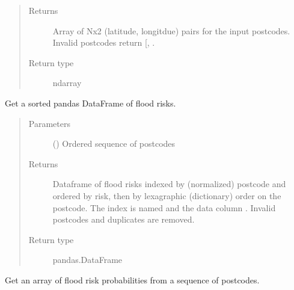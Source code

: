 \documentclass[letterpaper,10pt,english]{sphinxmanual}
\begin{document}
\begin{fulllineitems}
\begin{fulllineitems}
\begin{quote}
\begin{description}
\item[{Returns}] \leavevmode
Array of Nx2 (latitude, longitdue) pairs for the input postcodes.
Invalid postcodes return {[}, \sphinxtitleref{numpy.nan}{]}.

\item[{Return type}] \leavevmode
ndarray

\end{description}\end{quote}

\end{fulllineitems}


\begin{fulllineitems}
\label{\detokenize{index:flood_tool.Tool.get_sorted_annual_flood_risk}}
Get a sorted pandas DataFrame of flood risks.
\begin{quote}\begin{description}
\item[{Parameters}] \leavevmode
{} () \textendash{} Ordered sequence of postcodes

\item[{Returns}] \leavevmode
Dataframe of flood risks indexed by (normalized) postcode and ordered by risk,
then by lexagraphic (dictionary) order on the postcode. The index is named
 and the data column .
Invalid postcodes and duplicates are removed.

\item[{Return type}] \leavevmode
pandas.DataFrame

\end{description}\end{quote}

\end{fulllineitems}


\begin{fulllineitems}
\label{\detokenize{index:flood_tool.Tool.get_sorted_flood_probability}}
Get an array of flood risk probabilities from a sequence of postcodes.


\end{fulllineitems}
\end{fulllineitems}
\end{document}
